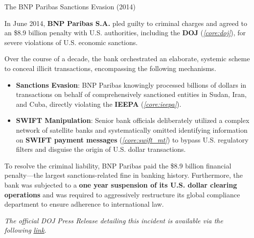 \documentclass[10pt]{article}
\begin{document}
    \begin{core}[label=core:bnp_paribas]{The BNP Paribas Sanctions Evasion (2014)}

      In June 2014, \textbf{BNP Paribas S.A.} pled guilty to criminal charges and agreed to an \$8.9 billion penalty with U.S. authorities, including the \textbf{DOJ} (\textit{\autoref{core:doj}}), for severe violations of U.S. economic sanctions. 

      Over the course of a decade, the bank orchestrated an elaborate, systemic scheme to conceal illicit transactions, encompassing the following mechanisms.

      \begin{itemize}

        \item \textbf{Sanctions Evasion}: BNP Paribas knowingly processed billions of dollars in transactions on behalf of comprehensively sanctioned entities in Sudan, Iran, and Cuba, directly violating the \textbf{IEEPA} (\textit{\autoref{core:ieepa}}).

        \item \textbf{SWIFT Manipulation}: Senior bank officials deliberately utilized a complex network of satellite banks and systematically omitted identifying information on \textbf{SWIFT payment messages} (\textit{\autoref{core:swift_mt}}) to bypass U.S. regulatory filters and disguise the origin of U.S. dollar transactions.

      \end{itemize}

      To resolve the criminal liability, BNP Paribas paid the \$8.9 billion financial penalty---the largest sanctions-related fine in banking history. Furthermore, the bank was subjected to a \textbf{one year suspension of its U.S. dollar clearing operations} and was required to aggressively restructure its global compliance department to ensure adherence to international law.

      \textit{The official DOJ Press Release detailing this incident is available via the following} \href{ https://www.fbi.gov/news/press-releases/bnp-paribas-agrees-to-plead-guilty-and-to-pay-8.9-billion-for-illegally-processing-financial-transactions-for-countries-subject-to-u.s.-economic-sanctions#:~:text=BNP%20Paribas%20Agrees%20to%20Plead%20Guilty%20and,Enemy%20Act%20(TWEA)%20by%20processing%20billions%20of}{\textit{link}}.

    \end{core}
\end{document}
